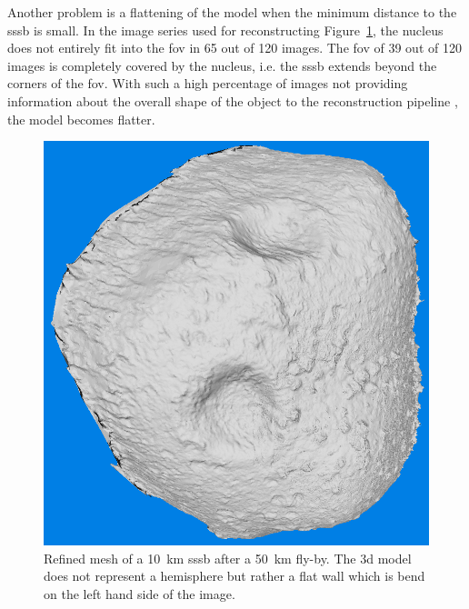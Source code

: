 Another problem is a flattening of the model when the minimum distance to the \gls{sssb} is small. In the image series used for reconstructing Figure~\ref{fig:model_flat}, the nucleus does not entirely fit into the \gls{fov} in \SI{65}{} out of \SI{120}{} images. The \gls{fov} of \SI{39}{} out of \SI{120}{} images is completely covered by the nucleus, i.e. the \gls{sssb} extends beyond the corners of the \gls{fov}. With such a high percentage of images not providing information about the overall shape of the object to the reconstruction pipeline , the model becomes flatter.

\begin{figure}[htb]
    \centering
    \includegraphics[width=.5\textwidth]{doc/thesis/0_figures/models_quality/50_10/120_50_10_refine1.png}
    \caption{Refined mesh of a \SI{10}{\kilo\meter} \gls{sssb} after a \SI{50}{\kilo\meter} fly-by. The \gls{3d} model does not represent a hemisphere but rather a flat wall which is bend on the left hand side of the image.}
    \label{fig:model_flat}
\end{figure}


